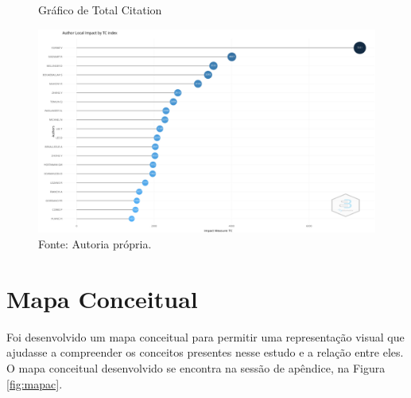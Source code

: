 \clearpage
\begin{figure} [h]	
    \centering
    \caption{Gráfico de Total Citation}
    \includegraphics[width=1\textwidth,trim={0 0.8cm 0 
    1cm},clip]{Figures/newplot.png}
    \caption*{Fonte: Autoria própria.}
    \label{fig:autores}
\end{figure}

\section{Mapa Conceitual}

Foi desenvolvido um mapa conceitual para permitir uma representação visual que ajudasse a compreender os conceitos presentes nesse estudo e a relação entre eles. O mapa conceitual desenvolvido se encontra na sessão de apêndice, na Figura \ref{fig:mapac}.


